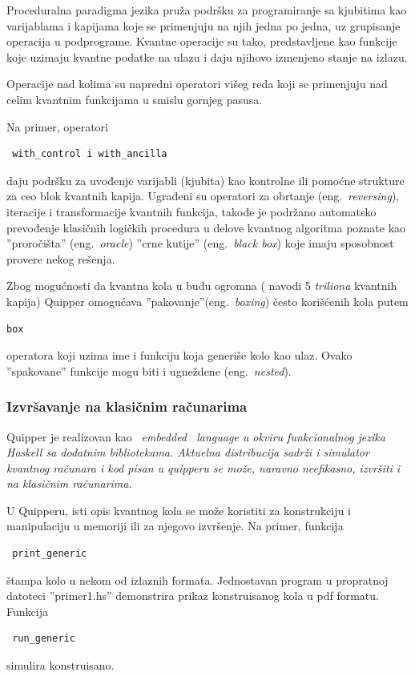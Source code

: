 \documentclass[a4paper]{article}
\begin{document}
{Proceduralna paradigma jezika pruža podršku za programiranje sa kjubitima kao varijablama i kapijama koje se primenjuju na njih jedna po jedna, uz grupisanje operacija u podprograme. Kvantne operacije su tako, predstavljene kao funkcije koje uzimaju kvantne podatke na ulazu i daju njihovo izmenjeno stanje na izlazu.

Operacije nad kolima su napredni operatori višeg reda koji se primenjuju nad celim kvantnim funkcijama u smislu gornjeg pasusa.

Na primer, operatori \begin{verbatim} with_control i with_ancilla \end{verbatim} daju podršku za uvođenje varijabli (kjubita) kao kontrolne ili pomoćne strukture za ceo blok kvantnih kapija. Ugrađeni su operatori za obrtanje (eng.~\emph{reversing}), iteracije i transformacije kvantnih funkcija, takođe je podržano automatsko prevođenje klasičnih logičkih procedura u  delove kvantnog algoritma poznate kao ''proročišta'' (eng.~\emph{oracle}) ''crne kutije'' (eng.~\emph{black box}) koje imaju sposobnost provere nekog rešenja.

Zbog mogućnosti da kvantna kola u budu ogromna (\cite{quipper_language} navodi 5 \emph{triliona} kvantnih kapija) Quipper omogućava ''pakovanje''(eng.~\emph{boxing}) često korišćenih kola putem \begin{verbatim}
box
\end{verbatim} operatora koji uzima ime i funkciju koja generiše kolo kao ulaz. Ovako ''spakovane'' funkcije mogu biti i ugneždene (eng.~\emph{nested}).


\subsubsection{Izvršavanje na klasičnim računarima}
\label{sec:quipperizvrsavanje}

Quipper je realizovan kao ~\em embedded ~\em language u okviru funkcionalnog jezika Haskell sa dodatnim bibliotekama. Aktuelna distribucija sadrži i simulator kvantnog računara i kod pisan u quipperu se može, naravno neefikasno, izvršiti i na klasičnim računarima.

U Quipperu, isti opis kvantnog kola se može koristiti za konstrukciju i manipulaciju u memoriji ili za njegovo izvršenje. Na primer, funkcija \begin{verbatim} print_generic \end{verbatim} štampa kolo u nekom od izlaznih formata. Jednostavan program u propratnoj datoteci ''primer1.hs'' demonstrira prikaz konstruisanog kola u pdf formatu.\\
Funkcija \begin{verbatim} run_generic \end{verbatim} simulira konstruisano.

}
\end{document}
